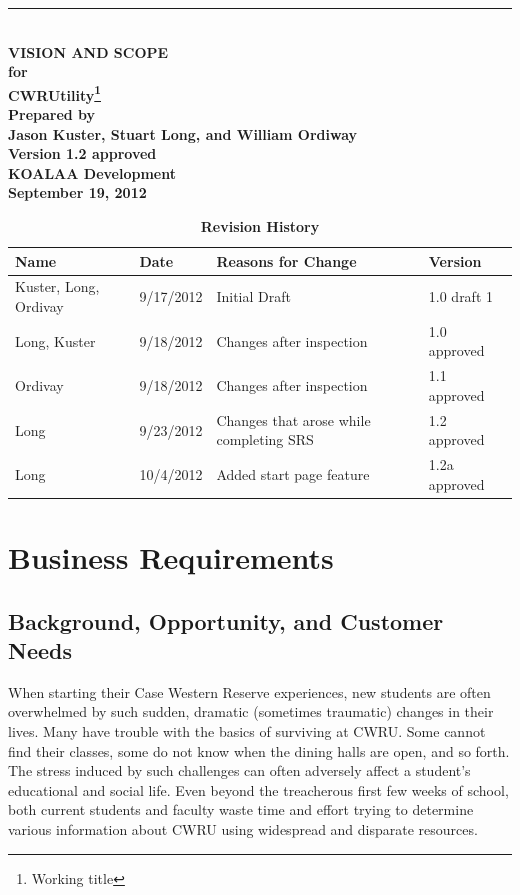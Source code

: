 \documentclass[pdftex,12pt,letter]{article}
\newcommand{\HRule}{\rule{\linewidth}{0.5mm}}
\begin{document}
\begin{titlepage}
\begin{flushright}
\HRule \\[0.4cm]
{ \bfseries
{\huge  VISION AND SCOPE\\[1cm]}
{\Large for\\[1cm]}
{\huge CWRUtility\large{\footnote[1]{Working title}}\\[4cm]}
{\large Prepared by\\Jason Kuster, Stuart Long, and William Ordiway\\[1cm]
Version 1.2 approved\\[1cm]
KOALAA Development\\[1cm]
September 19, 2012}}
\end{flushright}
\end{titlepage}
\tableofcontents{}
\begin{table}[!h]
\caption*{\bfseries Revision History}
\begin{tabularx}{\textwidth }[t]{|l|Y|Y|Y|}
\hline
\bfseries Name & \bfseries Date & \bfseries Reasons for Change & \bfseries Version \\ \hline
Kuster, Long, Ordivay & 9/17/2012 & Initial Draft & 1.0 draft 1\\ \hline
Long, Kuster & 9/18/2012 & Changes after inspection & 1.0 approved\\ \hline
Ordivay & 9/18/2012 & Changes after inspection & 1.1 approved\\ \hline
Long & 9/23/2012 & Changes that arose while completing SRS & 1.2 approved\\ \hline
Long & 10/4/2012 & Added start page feature & 1.2a approved\\ \hline
\end{tabularx}
\end{table}
\FloatBarrier
\newpage
\section{Business Requirements}
\subsection{Background, Opportunity, and Customer Needs}
When starting their Case Western Reserve experiences, new students are often overwhelmed by such sudden, dramatic (sometimes traumatic) changes in their lives. Many have trouble with the basics of surviving at CWRU. Some cannot find their classes, some do not know when the dining halls are open, and so forth. The stress induced by such challenges can often adversely affect a student's educational and social life. Even beyond the treacherous first few weeks of school, both current students and faculty waste time and effort trying to determine various information about CWRU using widespread and disparate resources.\\
\end{document}
